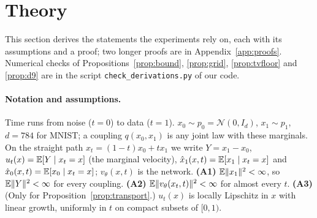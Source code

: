 \section{Theory}\label{sec:theory}
This section derives the statements the experiments rely on, each with its assumptions and a proof; two longer proofs are in Appendix~\ref{app:proofs}. Numerical checks of Propositions~\ref{prop:bound}, \ref{prop:grid}, \ref{prop:tvfloor} and \ref{prop:d9} are in the script \texttt{check\_derivations.py} of our code.

\paragraph{Notation and assumptions.} Time runs from noise ($t=0$) to data ($t=1$). $x_0\sim p_0=\mathcal N(0,I_d)$, $x_1\sim p_1$, $d=784$ for MNIST; a coupling $q(x_0,x_1)$ is any joint law with these marginals. On the straight path $x_t=(1-t)x_0+tx_1$ we write $Y=x_1-x_0$, $u_t(x)=\mathbb{E}[Y\mid x_t=x]$ (the marginal velocity), $\hat x_1(x,t)=\mathbb{E}[x_1\mid x_t=x]$ and $\hat x_0(x,t)=\mathbb{E}[x_0\mid x_t=x]$; $v_\theta(x,t)$ is the network.
\textbf{(A1)} $\mathbb{E}\|x_1\|^2<\infty$, so $\mathbb{E}\|Y\|^2<\infty$ for every coupling.
\textbf{(A2)} $\mathbb{E}\|v_\theta(x_t,t)\|^2<\infty$ for almost every $t$.
\textbf{(A3)} (Only for Proposition~\ref{prop:transport}.) $u_t(x)$ is locally Lipschitz in $x$ with linear growth, uniformly in $t$ on compact subsets of $[0,1)$.

